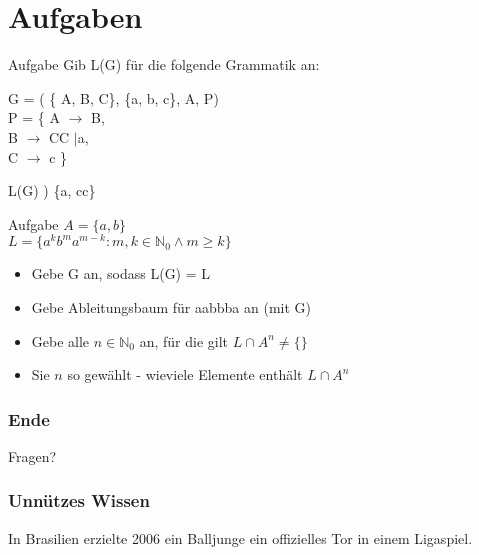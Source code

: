 \documentclass{beamer}
\begin{document}
\section{Aufgaben}
\begin{frame}
\begin{block}{Aufgabe}
Gib L(G) f\"ur die folgende Grammatik an:
\begin{center}
G = ( \{ A, B, C\}, \{a, b, c\}, A, P) \\
P = \{ A $\rightarrow$ B, \\
B $\rightarrow$ CC $\mid$a, \\
C $\rightarrow$ c
\}
\end{center}
\pause
\begin{example}
L(G) ) \{a, cc\}
\end{example}
\end{block}
\end{frame}
\begin{frame}
\begin{block}{Aufgabe}
$ A = \{a,b\}$\\
$ L = \{a^kb^ma^{m-k} : m,k \in \mathbb{N}_0 \land m \ge k\} $
\begin{itemize}
\item Gebe G an, sodass L(G) = L
\item Gebe Ableitungsbaum für aabbba an (mit G)
\item Gebe alle $n \in \mathbb{N}_0$ an, für die gilt $L \cap A^n \not= \{\}$
\item Sie $n$ so gewählt - wieviele Elemente enthält $L \cap A^n$
\end{itemize}
\end{block}
\end{frame}
\begin {frame}
\frametitle {Ende}
\begin {center}
Fragen?
\end {center}
\end {frame}
\begin{frame}
\frametitle{Unnützes Wissen}
\begin{center}
In Brasilien erzielte 2006 ein Balljunge ein offizielles Tor in einem Ligaspiel.
\end{center}
\end{frame}
\end{document}
